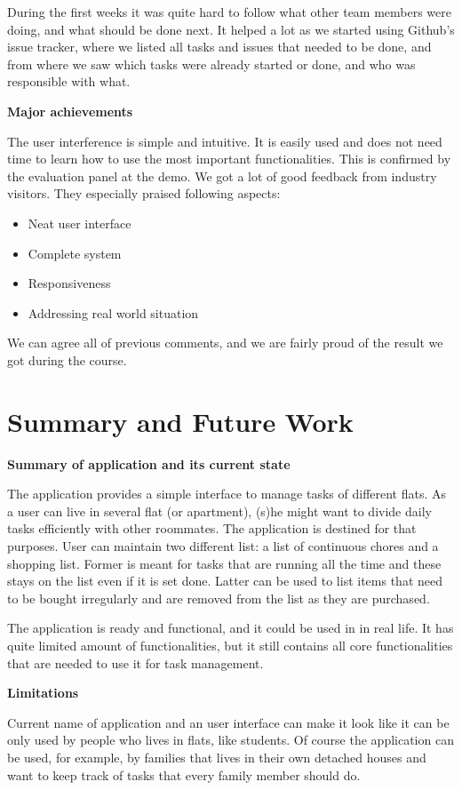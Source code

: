 \documentclass{sig-alt-release2}
\begin{document}
During the first weeks it was quite hard to follow what other team members were doing, and what should be done next. It helped a lot as we started using Github{’}s issue tracker, where we listed all tasks and issues that needed to be done, and from where we saw which tasks were already started or done, and who was responsible with what.

\textbf{Major achievements}
 
The user interference is simple and intuitive. It is easily used and does not need time to learn how to use the most important functionalities. This is confirmed by the evaluation panel at the demo. We got a lot of good feedback from industry visitors. They especially praised following aspects:
\begin{itemize}
\item Neat user interface
\item Complete system
\item Responsiveness
\item Addressing real world situation
\end{itemize}
We can agree all of previous comments, and we are fairly proud of the result we got during the course.

\section{Summary and Future Work}

\textbf{Summary of application and its current state}

The application provides a simple interface to manage tasks of different flats. As a user can live in several flat (or apartment), (s)he might want to divide daily tasks efficiently with other roommates. The application is destined for that purposes. User can maintain two different list: a list of continuous chores and a shopping list. Former is meant for tasks that are running all the time and these stays on the list even if it is set done. Latter can be used to list items that need to be bought irregularly and are removed from the list as they are purchased.

The application is ready and functional, and it could be used in in real life. It has quite limited amount of functionalities, but it still contains all core functionalities that are needed to use it for task management.

\textbf{Limitations}

Current name of application and an user interface can make it look like it can be only used by people who lives in flats, like students. Of course the application can be used, for example, by families that lives in their own detached houses and want to keep track of tasks that every family member should do.
\end{document}
